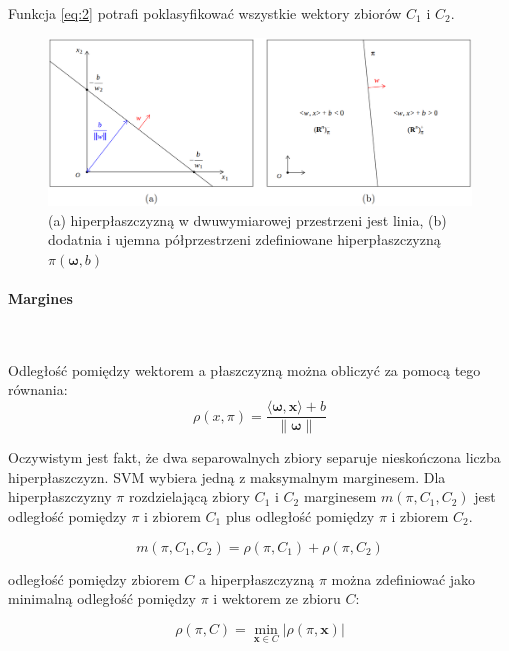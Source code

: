 \documentclass[paper=a4, fontsize=11pt]{scrartcl} %
\numberwithin{equation}{section} %
\numberwithin{figure}{section} %
\newcommand{\norm}[1]{\left\lVert#1\right\rVert}
\newcommand{\myparagraph}[1]{\paragraph{#1}\mbox{}\\}
\begin{document}
    Funkcja \ref{eq:2} potrafi poklasyfikować wszystkie wektory zbiorów $C_1$ i $C_2$.

    \begin{figure}[H]
        \begin{center}
            \includegraphics[scale=0.4]{./img/hyperplane_expl.png}
            \caption{(a) hiperpłaszczyzną w dwuwymiarowej przestrzeni jest linia, (b) dodatnia
            i ujemna półprzestrzeni zdefiniowane hiperpłaszczyzną $\pi(\pmb{\omega},b)$ \cite{nefedov2016support}}
            \label{fig:hiperplane_expl}
        \end{center}
    \end{figure}

\myparagraph{Margines}
    \par Odległość pomiędzy wektorem a płaszczyzną można obliczyć za pomocą tego równania:
    \begin{equation}
        \rho(x,\pi) = \frac{\langle \pmb{\omega}, \pmb{x} \rangle + b}{\norm{\pmb{\omega}}}
    \end{equation}

    \par Oczywistym jest fakt, że dwa separowalnych zbiory separuje nieskończona liczba
    hiperpłaszczyzn. SVM wybiera jedną z maksymalnym marginesem. Dla hiperpłaszczyzny $\pi$
    rozdzielającą zbiory $C_1$ i $C_2$ marginesem $m(\pi, C_1, C_2)$ jest odległość pomiędzy
    $\pi$ i zbiorem $C_1$ plus odległość pomiędzy $\pi$ i zbiorem $C_2$.

    \begin{equation}
        m(\pi, C_1, C_2) = \rho(\pi, C_1) + \rho(\pi, C_2)
    \end{equation}

    odległość pomiędzy zbiorem $C$ a hiperpłaszczyzną $\pi$ można zdefiniować jako minimalną odległość
    pomiędzy $\pi$ i wektorem ze zbioru $C$:

    \begin{equation}
        \rho(\pi, C) = \min\limits_{\pmb{x} \in C} \lvert \rho(\pi, \pmb{x}) \rvert
    \end{equation}
\end{document}
